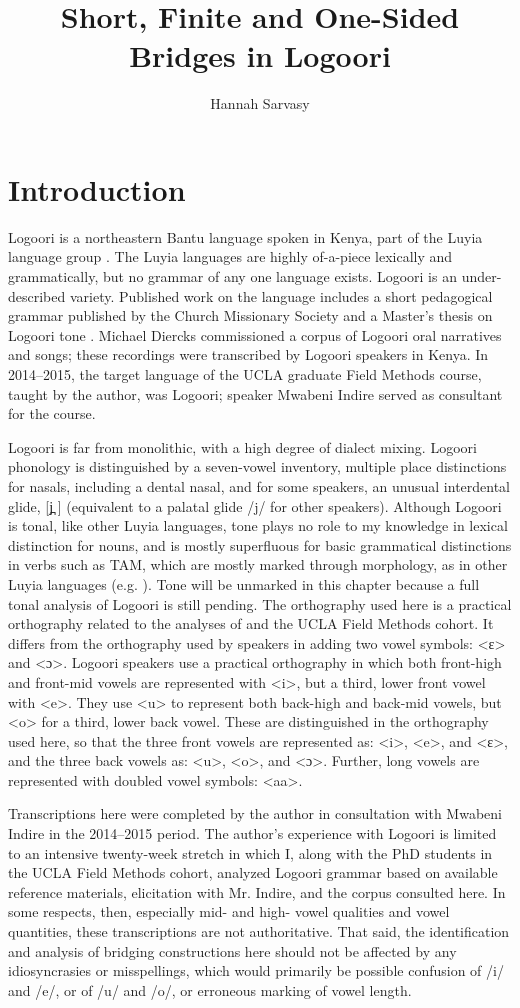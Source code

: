 \documentclass[output=paper]{LSP/langsci}
\author{
  Hannah Sarvasy\affiliation{Australian National University}
}
\title{Short, Finite and One-Sided Bridges in Logoori}
\begin{document}
\section{Introduction}
\label{Saintro}
Logoori is a northeastern Bantu language spoken in Kenya, part of the Luyia language group \citep{Mould1981}. The Luyia languages are highly of-a-piece lexically and grammatically, but no grammar of any one language exists. Logoori is an under-described variety. Published work on the language includes a short pedagogical grammar published by the Church Missionary Society \citep{Appleby1961} and a Master’s thesis on Logoori tone \citep{Leung1991}. Michael Diercks commissioned a corpus of Logoori oral narratives and songs; these recordings were transcribed by Logoori speakers in Kenya. In 2014--2015, the target language of the UCLA graduate Field Methods course, taught by the author, was Logoori; speaker Mwabeni Indire served as consultant for the course. 

Logoori is far from monolithic, with a high degree of dialect mixing. Logoori phonology is distinguished by a seven-vowel inventory, multiple place distinctions for nasals, including a dental nasal, and for some speakers, an unusual interdental glide, [j̪ ]  (equivalent to a palatal glide /j/ for other speakers). Although Logoori is tonal, like other Luyia languages, tone plays no role to my knowledge in lexical distinction for nouns, and is mostly superfluous for basic grammatical distinctions in verbs such as TAM, which are mostly marked through morphology, as in other Luyia languages (e.g. \citealt{Marlo2008}). Tone will be unmarked in this chapter because a full tonal analysis of Logoori is still pending. The orthography used here is a practical orthography related to the analyses of \citet{Leung1991} and the UCLA Field Methods cohort. It differs from the orthography used by speakers in adding two vowel symbols: <ɛ> and <ɔ>. Logoori speakers use a practical orthography in which both front-high and front-mid vowels are represented with <i>, but a third, lower front vowel with <e>. They use <u> to represent both back-high and back-mid vowels, but <o> for a third, lower back vowel. These are distinguished in the orthography used here, so that the three front vowels are represented as: <i>, <e>, and <ɛ>, and the three back vowels as: <u>, <o>, and <ɔ>. Further, long vowels are represented with doubled vowel symbols: <aa>. 

Transcriptions here were completed by the author in consultation with Mwabeni Indire in the 2014--2015 period. The author’s experience with Logoori is limited to an intensive twenty-week stretch in which I, along with the PhD students in the UCLA Field Methods cohort, analyzed Logoori grammar based on available reference materials, elicitation with Mr. Indire, and the corpus consulted here. In some respects, then, especially mid- and high- vowel qualities and vowel quantities, these transcriptions are not authoritative. That said, the identification and analysis of bridging constructions here should not be affected by any idiosyncrasies or misspellings, which would primarily be possible confusion of /i/ and /e/, or of /u/ and /o/, or erroneous marking of vowel length. 
\end{document}
